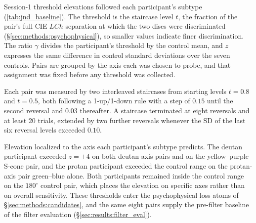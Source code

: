 
\renewcommand{\thetable}{S\arabic{table}}\setcounter{table}{0}




Session-1 threshold elevations followed each participant's subtype (\cref{tab:jnd_baseline}). The threshold is the staircase level $t$, the fraction of the pair's full CIE $LCh$ separation at which the two discs were discriminated (\S\ref{sec:methods:psychophysical}), so smaller values indicate finer discrimination. The ratio $\gamma$ divides the participant's threshold by the control mean, and $z$ expresses the same difference in control standard deviations over the seven controls. Pairs are grouped by the axis each was chosen to probe, and that assignment was fixed before any threshold was collected.

Each pair was measured by two interleaved staircases from starting levels $t = 0.8$ and $t = 0.5$, both following a 1-up/1-down rule with a step of $0.15$ until the second reversal and $0.03$ thereafter. A staircase terminated at eight reversals and at least 20 trials, extended by two further reversals whenever the SD of the last six reversal levels exceeded $0.10$.

Elevation localized to the axis each participant's subtype predicts. The deutan participant exceeded $z = +4$ on both deutan-axis pairs and on the yellow--purple S-cone pair, and the protan participant exceeded the control range on the protan-axis pair green--blue alone. Both participants remained inside the control range on the $180^\circ$ control pair, which places the elevation on specific axes rather than on overall sensitivity. These thresholds enter the psychophysical loss atoms of \S\ref{sec:methods:candidates}, and the same eight pairs supply the pre-filter baseline of the filter evaluation (\S\ref{sec:results:filter_eval}).


